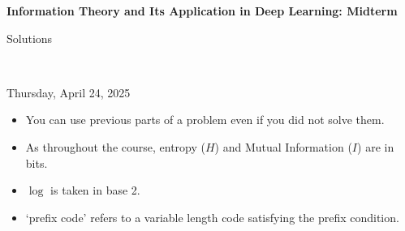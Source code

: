 \documentclass[12pt]{article}
\begin{document}
\begin{center}
{\bf Information Theory and Its Application in Deep Learning: Midterm \begin{solution}Solutions\end{solution}} \\ \medskip
\begin{problem}Thursday, April 24, 2025 \end{problem}
\end{center}

\begin{problem}
\noindent 
\begin{itemize}
\item You can use previous parts of a problem even if you did not solve them.
\item As throughout the course, entropy ($H$) and Mutual Information ($I$) are in bits.
\item $\log$ is taken in base 2. 
\item `prefix code' refers to a variable length code satisfying the prefix condition.  
\end{itemize}
\end{problem}

\begin{solution}
\end{solution}

\end{document}
